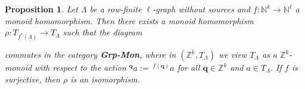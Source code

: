 \documentclass[a4paper,reqno,12pt]{amsart}
\numberwithin{equation}{section}
\newtheorem{prop}[thm]{Proposition}
\theoremstyle{definition}
\theoremstyle{remark}
\newcommand{\Q}{\mathbf{q}}
\begin{document}
\begin{prop}\label{pro TM under pullbacks}
Let $\Lambda$ be a row-finite $\ell$-graph without sources and $f:\mathbb{N}^k\longrightarrow \mathbb{N}^\ell$ a monoid homomorphism. Then there exists a monoid homomorphism $\rho:T_{f^*(\Lambda)}\longrightarrow T_{\Lambda}$ such that the diagram 

\begin{center}
\end{center}
commutes in the category \textup{\textbf{Grp-Mon}}, where in $(\mathbb{Z}^k,T_\Lambda)$ we view $T_\Lambda$ as a $\mathbb{Z}^k$-monoid with respect to the action $^\Q a:=~^{f(\Q)}a$ for all $\Q\in \mathbb{Z}^k$ and $a\in T_\Lambda$. If $f$ is surjective, then $\rho$ is an isomorphism. 
\end{prop}
\end{document}
